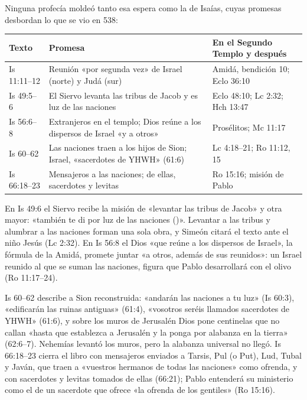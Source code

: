Ninguna profecía moldeó tanto esa espera como la de Isaías, cuyas promesas desbordan lo que se vio en 538:

\begin{center}\small
\renewcommand{\arraystretch}{1.2}
\begin{tabular}{>{\RaggedRight\arraybackslash}p{2.4cm}>{\RaggedRight\arraybackslash}p{6.2cm}>{\RaggedRight\arraybackslash}p{5.3cm}}
\toprule
\textbf{Texto} & \textbf{Promesa} & \textbf{En el Segundo Templo y después}\\
\midrule
Is 11:11--12 & Reunión «por segunda vez» de Israel (norte) y Judá (sur) & Amidá, bendición 10; Eclo 36:10\\
Is 49:5--6 & El Siervo levanta las tribus de Jacob y es luz de las naciones & Eclo 48:10; Lc 2:32; Hch 13:47\\
Is 56:6--8 & Extranjeros en el templo; Dios reúne a los dispersos de Israel «y a otros» & Prosélitos; Mc 11:17\\
Is 60--62 & Las naciones traen a los hijos de Sion; Israel, «sacerdotes de YHWH» (61:6) & Lc 4:18--21; Ro 11:12, 15\\
Is 66:18--23 & Mensajeros a las naciones; de ellas, sacerdotes y levitas & Ro 15:16; misión de Pablo\\
\bottomrule
\end{tabular}\end{center}

En Is 49:6 el Siervo recibe la misión de «levantar las tribus de Jacob» y otra mayor: «también te di por luz de las naciones ()». Levantar a las tribus y alumbrar a las naciones forman una sola obra, y Simeón citará el texto ante el niño Jesús (Lc 2:32). En Is 56:8 el Dios «que reúne a los dispersos de Israel», la fórmula de la Amidá, promete juntar «a otros, además de sus reunidos»: un Israel reunido al que se suman las naciones, figura que Pablo desarrollará con el olivo (Ro 11:17--24).

Is 60--62 describe a Sion reconstruida: «andarán las naciones a tu luz» (Is 60:3), «edificarán las ruinas antiguas» (61:4), «vosotros seréis llamados sacerdotes de YHWH» (61:6), y sobre los muros de Jerusalén Dios pone centinelas que no callan «hasta que establezca a Jerusalén y la ponga por alabanza en la tierra» (62:6--7). Nehemías levantó los muros, pero la alabanza universal no llegó. Is 66:18--23 cierra el libro con mensajeros enviados a Tarsis, Pul (o Put), Lud, Tubal y Javán, que traen a «vuestros hermanos de todas las naciones» como ofrenda, y con sacerdotes y levitas tomados de ellas (66:21); Pablo entenderá su ministerio como el de un sacerdote que ofrece «la ofrenda de los gentiles» (Ro 15:16).

